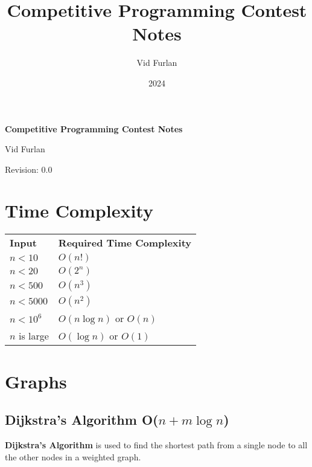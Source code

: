 \documentclass{article}
\title{Competitive Programming Contest Notes}
\author{Vid Furlan}
\date{2024}
\begin{document}
\begin{titlepage}
	\begin{center}
		\vspace*{5cm}

		\huge
        \textbf{Competitive Programming Contest Notes}

		\Large
		\vspace{7.0cm}
		Vid Furlan

        \normalsize
		\vspace{0.5cm}
		Revision: 0.0\\

	\end{center}
\end{titlepage}

\renewcommand{\contentsname}{\Large Index}
\tableofcontents
{}
\vspace{2.0cm}

\section{Time Complexity}
\begin{center}
    \begin{tabular}{ | l | l | }
    \hline
    \textbf{Input} & \textbf{Required Time Complexity} \\
    $n < 10$ & $O(n!)$ \\
    $n < 20$ & $O(2^n)$ \\
    $n < 500$ & $O(n^3)$ \\
    $n < 5000$ & $O(n^2)$ \\
    $n < 10^6$ & $O(n \log n)$ or $O(n)$ \\
    $n$ is large & $O(\log n)$ or $O(1)$ \\
    \hline
    \end{tabular}
\end{center}

\newpage

\section{Graphs}
\subsection{Dijkstra's Algorithm O($n + m \log n$)}

\textbf{Dijkstra's Algorithm} is used to find the shortest path from a single node to all the other nodes in a weighted graph.
\end{document}
